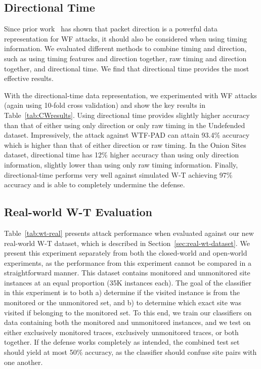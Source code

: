 \documentclass[USenglish,oneside,twocolumn]{article}
\begin{document}
\subsection{Directional Time}
\label{directionaltiming}

Since prior work~\cite{abe2016fingerprinting, Rimmer2018, Sirinam2018} has shown that packet direction is a powerful data representation for WF attacks, it should also be considered when using timing information. We evaluated different methods to combine timing and direction, such as using timing features and direction together, raw timing and direction together, and directional time. We find that directional time provides the most effective results. 

With the directional-time data representation, we experimented with WF attacks (again using 10-fold cross validation) and show the key results in Table~\ref{tab:CWresults}. Using directional time provides slightly higher accuracy than that of either using only direction or only raw timing in the Undefended dataset. Impressively, the attack against WTF-PAD can attain 93.4\% accuracy which is higher than that of either direction or raw timing. In the Onion Sites dataset, directional time has 12\% higher accuracy than using only direction information, slightly lower than using only raw timing information. Finally, directional-time performs very well against simulated W-T achieving 97\% accuracy and is able to completely undermine the defense.



\subsection{Real-world W-T Evaluation}

Table~\ref{tab:wt-real} presents attack performance when evaluated against our new real-world W-T dataset, which is described in Section~\ref{sec:real-wt-dataset}. We present this experiment separately from both the closed-world and open-world experiments, as the performance from this experiment cannot be compared in a straightforward manner. This dataset contains monitored and unmonitored site instances at an equal proportion (35K instances each). The goal of the classifier in this experiment is to both a) determine if the visited instance is from the monitored or the unmonitored set, and b) to determine which exact site was visited if belonging to the monitored set. To this end, we train our classifiers on data containing both the monitored and unmonitored instances, and we test on either exclusively monitored traces, exclusively unmonitored traces, or both together. If the defense works completely as intended, the combined test set should yield at most 50\% accuracy, as the classifier should confuse site pairs with one another.
\end{document}
